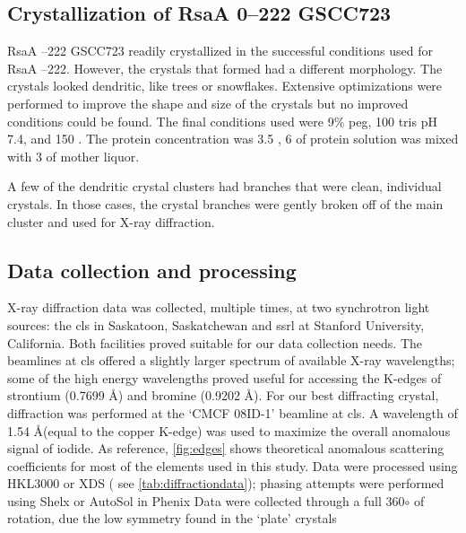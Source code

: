 \subsection{Crystallization of RsaA \del{}0--222 GSCC723} \label{sec:cryst-rsaa-del0}

RsaA --222 GSCC723 readily crystallized in the successful conditions used for RsaA --222. However, the crystals that formed had a different morphology. The crystals looked dendritic, like trees or snowflakes. Extensive optimizations were performed to improve the shape and size of the crystals but no improved conditions could be found. The final conditions used were 9\% \ac{peg}, 100 \millimolar{} tris pH 7.4, and 150 \millimolar{} . The protein concentration was 3.5 \mgperml{}, 6 \microlitre{} of protein solution was mixed with 3 \microlitre{} of mother liquor. 

A few of the dendritic crystal clusters had branches that were clean, individual crystals. In those cases, the crystal branches were gently broken off of the main cluster and used for X-ray diffraction.

\subsection{Data collection and processing}\label{sec:crystal-data-collection}
X-ray diffraction data was collected, multiple times, at two synchrotron light
sources: the \ac{cls} in Saskatoon, Saskatchewan and \ac{ssrl} at Stanford
University, California. Both facilities proved suitable for our data collection
needs. The beamlines at \ac{cls} offered a slightly larger spectrum of available
X-ray wavelengths; some of the high energy wavelengths proved useful for
accessing the K-edges of strontium (0.7699 \AA) and bromine (0.9202 \AA). For
our best diffracting crystal, diffraction was performed at the `CMCF 08ID-1'
beamline at \ac{cls}. A wavelength of 1.54 \AA (equal to the copper K-edge) was
used to maximize the overall anomalous signal of iodide.  As
reference, \cref{fig:edges} shows theoretical anomalous scattering coefficients
for most of the elements used in this study. Data were processed using
HKL3000 or XDS ( see
\cref{tab:diffractiondata}); phasing attempts were performed using
Shelx or AutoSol in
Phenix Data were collected through a full
360$\circ$ of rotation, due the low symmetry found in the `plate' crystals

